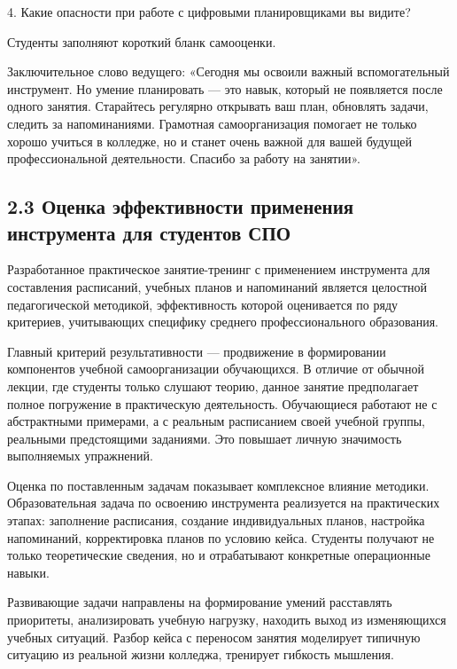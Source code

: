 \documentclass[
]{article}
\begin{document}
4. Какие опасности при работе с цифровыми планировщиками вы видите?

Студенты заполняют короткий бланк самооценки.

Заключительное слово ведущего: «Сегодня мы освоили важный
вспомогательный инструмент. Но умение планировать --- это навык, который
не появляется после одного занятия. Старайтесь регулярно открывать ваш
план, обновлять задачи, следить за напоминаниями. Грамотная
самоорганизация помогает не только хорошо учиться в колледже, но и
станет очень важной для вашей будущей профессиональной деятельности.
Спасибо за работу на занятии».

\subsection{\texorpdfstring{\textbf{2.3 Оценка эффективности применения
инструмента для студентов
СПО}}{2.3 Оценка эффективности применения инструмента для студентов СПО}}\label{ux43eux446ux435ux43dux43aux430-ux44dux444ux444ux435ux43aux442ux438ux432ux43dux43eux441ux442ux438-ux43fux440ux438ux43cux435ux43dux435ux43dux438ux44f-ux438ux43dux441ux442ux440ux443ux43cux435ux43dux442ux430-ux434ux43bux44f-ux441ux442ux443ux434ux435ux43dux442ux43eux432-ux441ux43fux43e}

Разработанное практическое занятие-тренинг с применением инструмента для
составления расписаний, учебных планов и напоминаний является целостной
педагогической методикой, эффективность которой оценивается по ряду
критериев, учитывающих специфику среднего профессионального образования.

Главный критерий результативности --- продвижение в формировании
компонентов учебной самоорганизации обучающихся. В отличие от обычной
лекции, где студенты только слушают теорию, данное занятие предполагает
полное погружение в практическую деятельность. Обучающиеся работают не с
абстрактными примерами, а с реальным расписанием своей учебной группы,
реальными предстоящими заданиями. Это повышает личную значимость
выполняемых упражнений.

Оценка по поставленным задачам показывает комплексное влияние методики.
Образовательная задача по освоению инструмента реализуется на
практических этапах: заполнение расписания, создание индивидуальных
планов, настройка напоминаний, корректировка планов по условию кейса.
Студенты получают не только теоретические сведения, но и отрабатывают
конкретные операционные навыки.

Развивающие задачи направлены на формирование умений расставлять
приоритеты, анализировать учебную нагрузку, находить выход из
изменяющихся учебных ситуаций. Разбор кейса с переносом занятия
моделирует типичную ситуацию из реальной жизни колледжа, тренирует
гибкость мышления.
\end{document}
